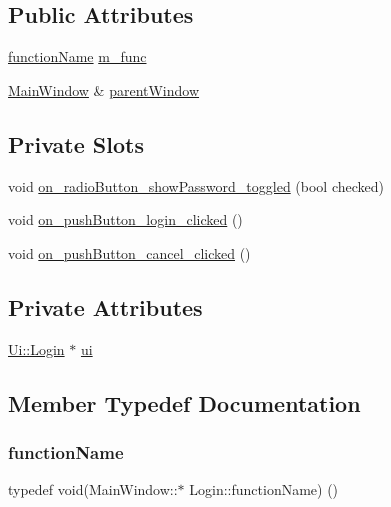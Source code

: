 \subsection*{Public Attributes}
\begin{DoxyCompactItemize}
\item 
\hyperlink{class_login_a05d702e414775468b6dddb9f69f4663b}{function\+Name} \hyperlink{class_login_ab6d49043230d621a53f4f15f0b8eddd0}{m\+\_\+func}
\item 
\hyperlink{class_main_window}{Main\+Window} \& \hyperlink{class_login_a667004f2fd95bf92e14e68fdc0b74a1e}{parent\+Window}
\end{DoxyCompactItemize}
\subsection*{Private Slots}
\begin{DoxyCompactItemize}
\item 
void \hyperlink{class_login_a54b3f67dc461c2d310abbf56ae5666fe}{on\+\_\+radio\+Button\+\_\+show\+Password\+\_\+toggled} (bool checked)
\item 
void \hyperlink{class_login_aac062d794e02accb46743a713c139cdd}{on\+\_\+push\+Button\+\_\+login\+\_\+clicked} ()
\item 
void \hyperlink{class_login_a4e3ad324e53e7f74de3470f3e5c492e4}{on\+\_\+push\+Button\+\_\+cancel\+\_\+clicked} ()
\end{DoxyCompactItemize}
\subsection*{Private Attributes}
\begin{DoxyCompactItemize}
\item 
\hyperlink{class_ui_1_1_login}{Ui\+::\+Login} $\ast$ \hyperlink{class_login_a55fa3b19085f864462451d3dd9efd2e1}{ui}
\end{DoxyCompactItemize}


\subsection{Member Typedef Documentation}
\mbox{\label{class_login_a05d702e414775468b6dddb9f69f4663b}} 
\subsubsection{\texorpdfstring{function\+Name}{functionName}}
{\footnotesize\ttfamily typedef void(Main\+Window\+::$\ast$ Login\+::function\+Name) ()}



